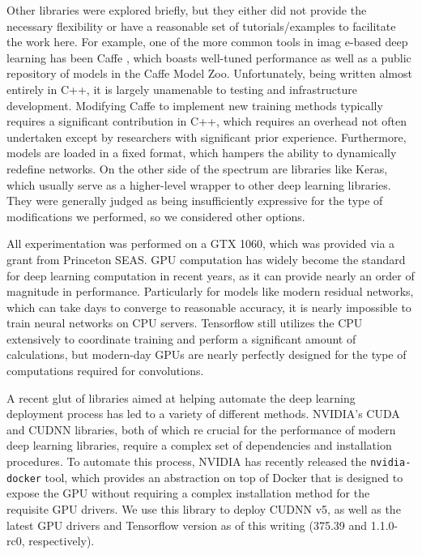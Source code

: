 Other libraries were explored briefly, but they either did not provide the necessary flexibility or have a reasonable set of tutorials/examples to facilitate the work here.
For example, one of the more common tools in imag e-based deep learning has been Caffe \cite{jia2014caffe}, which boasts well-tuned performance as well as a public repository of models in the Caffe Model Zoo.
Unfortunately, being written almost entirely in C++, it is largely unamenable to testing and infrastructure development.
Modifying Caffe to implement new training methods typically requires a significant contribution in C++, which requires an overhead not often undertaken except by researchers with significant prior experience.
Furthermore, models are loaded in a fixed format, which hampers the ability to dynamically redefine networks.
On the other side of the spectrum are libraries like Keras, which usually serve as a higher-level wrapper to other deep learning libraries.
They were generally judged as being insufficiently expressive for the type of modifications we performed, so we considered other options.

All experimentation was performed on a GTX 1060, which was provided via a grant from Princeton SEAS.
GPU computation has widely become the standard for deep learning computation in recent years, as it can provide nearly an order of magnitude in performance.
Particularly for models like modern residual networks, which can take days to converge to reasonable accuracy, it is nearly impossible to train neural networks on CPU servers.
Tensorflow still utilizes the CPU extensively to coordinate training and perform a significant amount of calculations, but modern-day GPUs are nearly perfectly designed for the type of computations required for convolutions.

A recent glut of libraries aimed at helping automate the deep learning deployment process has led to a variety of different methods.
NVIDIA's CUDA and CUDNN libraries, both of which re crucial for the performance of modern deep learning libraries, require a complex set of dependencies and installation procedures.
To automate this process, NVIDIA has recently released the \texttt{nvidia-docker} tool, which provides an abstraction on top of Docker that is designed to expose the GPU without requiring a complex installation method for the requisite GPU drivers.
We use this library to deploy CUDNN v5, as well as the latest GPU drivers and Tensorflow version as of this writing (375.39 and 1.1.0-rc0, respectively).

